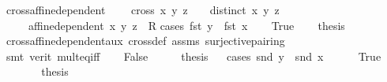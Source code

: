 \begin{isabellebody}
\ cross{\isacharunderscore}{\kern0pt}affine{\isacharunderscore}{\kern0pt}dependent{\isacharcolon}{\kern0pt}\ \isanewline
\ \ \ {\isachardoublequoteopen}cross{}\ x\ y\ z\ {\isacharequal}{\kern0pt}\ {}{\isachardoublequoteclose}\ \ {\isachardoublequoteopen}distinct\ {\isacharbrackleft}{\kern0pt}x{\isacharcomma}{\kern0pt}\ y{\isacharcomma}{\kern0pt}\ z{\isacharbrackright}{\kern0pt}{\isachardoublequoteclose}\isanewline
\ \ \ \ \ {\isachardoublequoteopen}affine{\isacharunderscore}{\kern0pt}dependent\ {\isacharbraceleft}{\kern0pt}x{\isacharcomma}{\kern0pt}\ y{\isacharcomma}{\kern0pt}\ z\ {\isacharcolon}{\kern0pt}{\isacharcolon}{\kern0pt}\ R{}{\isacharbraceright}{\kern0pt}{\isachardoublequoteclose}\isanewline
%
\isadelimproof
%
\endisadelimproof
%
\isatagproof
{}\isamarkupfalse%
{\isacharparenleft}{\kern0pt}cases\ {\isachardoublequoteopen}fst\ y\ {\isacharequal}{\kern0pt}\ fst\ x{\isachardoublequoteclose}{\isacharparenright}{\kern0pt}\isanewline
\ \ \isamarkupfalse%
\ True\isanewline
\ \ \isamarkupfalse%
\ {\isacharquery}{\kern0pt}thesis\ \isamarkupfalse%
\ cross{\isacharunderscore}{\kern0pt}affine{\isacharunderscore}{\kern0pt}dependent{\isacharunderscore}{\kern0pt}aux{}\ cross{}{\isacharunderscore}{\kern0pt}def\ assms{\isacharparenleft}{\kern0pt}{}{\isacharcomma}{\kern0pt}{}{\isacharparenright}{\kern0pt}\ surjective{\isacharunderscore}{\kern0pt}pairing\isanewline
\ \ \ \ \isamarkupfalse%
\ {\isacharparenleft}{\kern0pt}smt\ {\isacharparenleft}{\kern0pt}verit{\isacharparenright}{\kern0pt}\ mult{\isacharunderscore}{\kern0pt}eq{\isacharunderscore}{\kern0pt}{}{\isacharunderscore}{\kern0pt}iff{\isacharparenright}{\kern0pt}\isanewline
{}\isamarkupfalse%
\isanewline
\ \ \isamarkupfalse%
\ False\isanewline
\ \ \isamarkupfalse%
\ \isamarkupfalse%
\ {\isacharquery}{\kern0pt}thesis\isanewline
\ \ \isamarkupfalse%
{\isacharparenleft}{\kern0pt}cases\ {\isachardoublequoteopen}snd\ y\ {\isacharequal}{\kern0pt}\ snd\ x{\isachardoublequoteclose}{\isacharparenright}{\kern0pt}\isanewline
\ \ \ \ \isamarkupfalse%
\ True\isanewline
\ \ \ \ \isamarkupfalse%
\ \isamarkupfalse%
\ {\isacharquery}{\kern0pt}thesis\ \isanewline
\ \ \ \ \ \ \isamarkupfalse%

\end{isabellebody}
